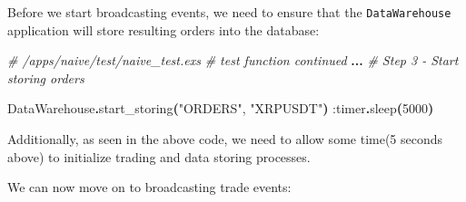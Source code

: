 \documentclass[
  oneside]{book}
\newenvironment{Shaded}{\begin{snugshade}}{\end{snugshade}}
\newcommand{\CommentTok}[1]{\textcolor[rgb]{0.56,0.35,0.01}{\textit{#1}}}
\newcommand{\ConstantTok}[1]{\textcolor[rgb]{0.56,0.35,0.01}{#1}}
\newcommand{\DecValTok}[1]{\textcolor[rgb]{0.00,0.00,0.81}{#1}}
\newcommand{\FunctionTok}[1]{\textcolor[rgb]{0.13,0.29,0.53}{\textbf{#1}}}
\newcommand{\NormalTok}[1]{#1}
\newcommand{\OperatorTok}[1]{\textcolor[rgb]{0.81,0.36,0.00}{\textbf{#1}}}
\newcommand{\StringTok}[1]{\textcolor[rgb]{0.31,0.60,0.02}{#1}}
\newcommand{\VariableTok}[1]{\textcolor[rgb]{0.00,0.00,0.00}{#1}}
\begin{document}
\newpage

Before we start broadcasting events, we need to ensure that the \texttt{DataWarehouse} application will store resulting orders into the database:

\begin{Shaded}
\begin{Highlighting}[]
    \CommentTok{\# /apps/naive/test/naive\_test.exs}
    \CommentTok{\# \textasciigrave{}test\textasciigrave{} function continued}
    \OperatorTok{...}
    \CommentTok{\# Step 3 {-} Start storing orders}

    \ConstantTok{DataWarehouse}\OperatorTok{.}\NormalTok{start\_storing}\FunctionTok{(}\StringTok{"ORDERS"}\NormalTok{, }\StringTok{"XRPUSDT"}\FunctionTok{)}
    \VariableTok{:timer}\OperatorTok{.}\NormalTok{sleep}\FunctionTok{(}\DecValTok{5000}\FunctionTok{)}
\end{Highlighting}
\end{Shaded}

Additionally, as seen in the above code, we need to allow some time(5 seconds above) to initialize trading and data storing processes.

We can now move on to broadcasting trade events:
\end{document}
